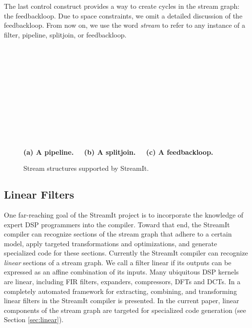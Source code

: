 The last control construct provides a way to create cycles in the
stream graph: the feedbackloop.  Due to space constraints, we omit a
detailed discussion of the feedbackloop. From now on, we use the word
{\it stream} to refer to any instance of a filter, pipeline,
splitjoin, or feedbackloop.

\begin{figure}[t]
\begin{center}
\begin{minipage}{0.46in}
\centering
{} \\
\end{minipage} 
~
\begin{minipage}{1.3in}
\centering
{} \\
\end{minipage}
~
\begin{minipage}{1.02in}
\centering
{} \\
\end{minipage} 
\\ ~ \\ {\bf \protect\small (a) A pipeline. ~~(b) A splitjoin. ~~(c) A feedbackloop.}
\caption{\protect\small Stream structures supported by StreamIt.
\protect\label{fig:structures}}
\end{center}
\end{figure}

\subsection{Linear Filters}
One far-reaching goal of the StreamIt project is to incorporate the
knowledge of expert DSP programmers into the compiler.  Toward that
end, the StreamIt compiler can recognize sections of the stream graph
that adhere to a certain model, apply targeted transformations and
optimizations, and generate specialized code for these sections.
Currently the StreamIt compiler can recognize {\it linear} sections of
a stream graph. We call a filter linear if its outputs can be
expressed as an affine combination of its inputs.  Many ubiquitous DSP
kernels are linear, including FIR filters, expanders, compressors,
DFTs and DCTs.  In \cite{streamit-linear} a completely automated
framework for extracting, combining, and transforming linear filters
in the StreamIt compiler is presented.  In the current paper, linear
components of the stream graph are targeted for specialized code
generation (see Section \ref{sec:linear}).
